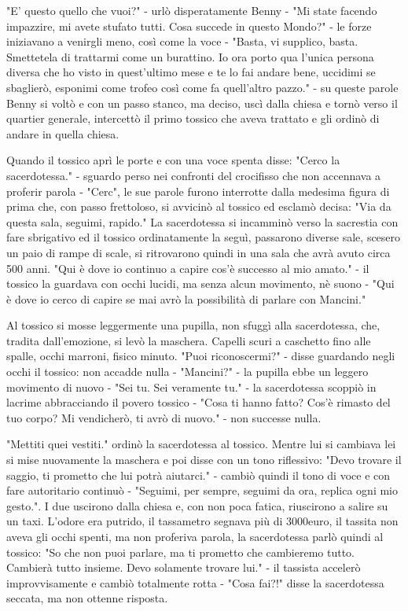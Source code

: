 "E' questo quello che vuoi?" - urlò disperatamente Benny - "Mi state facendo impazzire, mi avete stufato tutti. Cosa succede in questo Mondo?" - le forze iniziavano a venirgli meno, così come la voce - "Basta, vi supplico, basta. Smettetela di trattarmi come un burattino. Io ora porto qua l'unica persona diversa che ho visto in quest'ultimo mese e te lo fai andare bene, uccidimi se sbaglierò, esponimi come trofeo così come fa quell'altro pazzo." - su queste parole Benny si voltò e con un passo stanco, ma deciso, uscì dalla chiesa e tornò verso il quartier generale, intercettò il primo tossico che aveva trattato e gli ordinò di andare in quella chiesa.

Quando il tossico aprì le porte e con una voce spenta disse: "Cerco la sacerdotessa." - sguardo perso nei confronti del crocifisso che non accennava a proferir parola - "Cerc", le sue parole furono interrotte dalla medesima figura di prima che, con passo frettoloso, si avvicinò al tossico ed esclamò decisa: "Via da questa sala, seguimi, rapido."
La sacerdotessa si incamminò verso la sacrestia con fare sbrigativo ed il tossico ordinatamente la seguì, passarono diverse sale, scesero un paio di rampe di scale, si ritrovarono quindi in una sala che avrà avuto circa 500 anni. "Qui è dove io continuo a capire cos'è successo al mio amato." - il tossico la guardava con occhi lucidi, ma senza alcun movimento, nè suono - "Qui è dove io cerco di capire se mai avrò la possibilità di parlare con Mancini." 

Al tossico si mosse leggermente una pupilla, non sfuggì alla sacerdotessa, che, tradita dall'emozione, si levò la maschera. Capelli scuri a caschetto fino alle spalle, occhi marroni, fisico minuto.
"Puoi riconoscermi?" - disse guardando negli occhi il tossico: non accadde nulla - "Mancini?" - la pupilla ebbe un leggero movimento di nuovo - "Sei tu. Sei veramente tu." - la sacerdotessa scoppiò in lacrime abbracciando il povero tossico - "Cosa ti hanno fatto? Cos'è rimasto del tuo corpo? Mi vendicherò, ti avrò di nuovo." - non successe nulla.

"Mettiti quei vestiti." ordinò la sacerdotessa al tossico. Mentre lui si cambiava lei si mise nuovamente la maschera e poi disse con un tono riflessivo: "Devo trovare il saggio, ti prometto che lui potrà aiutarci." - cambiò quindi il tono di voce e con fare autoritario continuò - "Seguimi, per sempre, seguimi da ora, replica ogni mio gesto.". 
I due uscirono dalla chiesa e, con non poca fatica, riuscirono a salire su un taxi. L'odore era putrido, il tassametro segnava più di 3000euro, il tassita non aveva gli occhi spenti, ma non proferiva parola, la sacerdotessa parlò quindi al tossico: "So che non puoi parlare, ma ti prometto che cambieremo tutto. Cambierà tutto insieme. Devo solamente trovare lui." - il tassista accelerò improvvisamente e cambiò totalmente rotta - "Cosa fai?!" disse la sacerdotessa seccata, ma non ottenne risposta.

